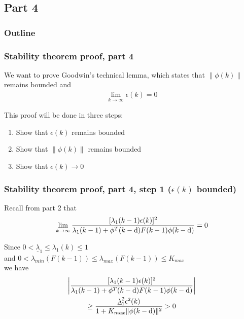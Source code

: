 \subsection{Part 4}
\begin{frame}
    \frametitle{Outline}
    \tableofcontents[currentsection]
\end{frame}

\begin{frame}
    \frametitle{Stability theorem proof, part 4}

    We want to prove Goodwin's technical lemma, which states that $\| \phi(k) \|$ remains bounded and
    \begin{align*}
        \lim_{k \rightarrow \infty} \epsilon(k) = 0
    \end{align*}
    \pause

    This proof will be done in three steps:
    \begin{enumerate}
        \item
        Show that $\epsilon(k)$ remains bounded
        
        \item
        Show that $\| \phi(k) \|$ remains bounded
        
        \item
        Show that $\epsilon(k) \longrightarrow 0$
    \end{enumerate}
\end{frame}

\begin{frame}
    \frametitle{Stability theorem proof, part 4, step 1 ($\epsilon(k)$ bounded)}    

    Recall from part 2 that
    \begin{align*}
        \lim_{k \rightarrow \infty} \frac{ [\lambda_1(k-1) \epsilon(k)]^2 }
            { \lambda_1(k-1) + \phi^T(k-\textrm{d}) F(k-1) \phi(k-\textrm{d}) } = 0
    \end{align*}
    \pause
    
    Since $0 < \underline{\lambda}_1 \leq \lambda_1(k) \leq 1$ \\
    and $0 < \lambda_{min}(F(k-1)) \leq \lambda_{max}(F(k-1)) \leq K_{max}$ \\
    we have
    \begin{multline*}
        \left| \frac{ [\lambda_1(k-1) \epsilon(k)]^2 }
            { \lambda_1(k-1) + \phi^T(k-\textrm{d}) F(k-1) \phi(k-\textrm{d}) } \right| \\
        \geq \frac{ \underline{\lambda}_1^2 \epsilon^2(k) }{ 1 + K_{max} \| \phi(k-\textrm{d}) \|^2 } > 0
    \end{multline*}
    
\end{frame}

